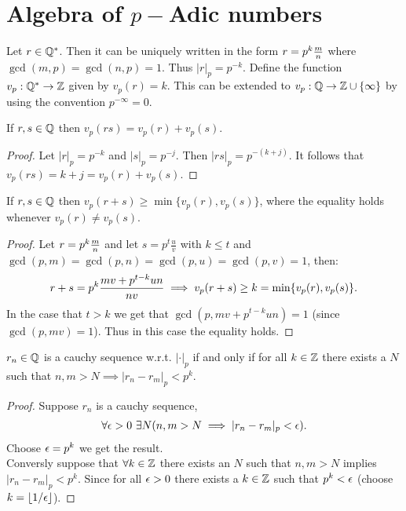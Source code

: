 \section{Algebra of $p-$Adic numbers}
\begin{definition}
  Let $r\in \mathbb{Q}^*$. Then it can be uniquely written in the form $r = p^k \frac{m}{n}$ where $\gcd(m,p) = \gcd(n,p) = 1$. Thus $|r|_p = p^{-k}$. Define the function $v_p:\mathbb{Q}^* \to \mathbb{Z}$ given by $v_p(r) = k$. This can be extended to $v_p: \mathbb{Q} \to \mathbb{Z}\cup \{\infty\}$ by using the convention $p^{-\infty} = 0$.
\end{definition}
\begin{proposition}
  If $r,s\in \mathbb{Q}$ then $v_p(rs) = v_p(r) + v_p(s)$.
\end{proposition}
\begin{proof}
  Let $|r|_p = p^{-k}$ and $|s|_p = p^{-j}$. Then $|rs|_p = p^{-(k+j)}$. It follows that $v_p(rs) = k+j = v_p(r) + v_p(s)$.
\end{proof}
\begin{proposition}
  If $r,s\in \mathbb{Q}$ then $v_p(r+s) \geq \min\{v_p(r),v_p(s)\}$, where the equality holds whenever $v_p(r) \neq v_p(s)$.
\end{proposition}
\begin{proof}
  Let $r = p^k \frac{m}{n}$ and let $s = p^t \frac{u}{v}$ with $k\leq t$ and $\gcd(p,m) = \gcd(p,n) = \gcd(p,u) = \gcd(p,v) = 1$, then:
  \begin{align*}
    r+s = p^k \frac{mv + p^{t-k}un}{nv} \implies v_p(r+s) \geq k = \min\{v_p(r), v_p(s)\}.
  \end{align*}
  In the case that $t>k$ we get that $\gcd(p, mv + p^{t-k}un) = 1$ (since $\gcd(p,mv)=1$). Thus in this case the equality holds.
\end{proof}
\begin{proposition}
  $r_n\in \mathbb{Q}$ is a cauchy sequence w.r.t. $|\cdot|_p$ if and only if for all $k\in \mathbb{Z}$ there exists a $N$ such that $n,m>N \implies |r_n-r_m|_p < p^k$.
\end{proposition}
\begin{proof}
  Suppose $r_n$ is a cauchy sequence,
  \begin{align*}
    \forall \epsilon>0 \ \exists N (n,m>N \implies |r_n-r_m|_p<\epsilon).
  \end{align*}
  Choose $\epsilon = p^k$ we get the result.\\

  Conversly suppose that $\forall k\in \mathbb{Z}$ there exists an $N$ such that $n,m>N$ implies $|r_n-r_m|_p < p^k$. Since for all $\epsilon>0$ there exists a $k\in \mathbb{Z}$ such that $p^k < \epsilon$ (choose $k=\lfloor 1/\epsilon \rfloor$).
\end{proof}
